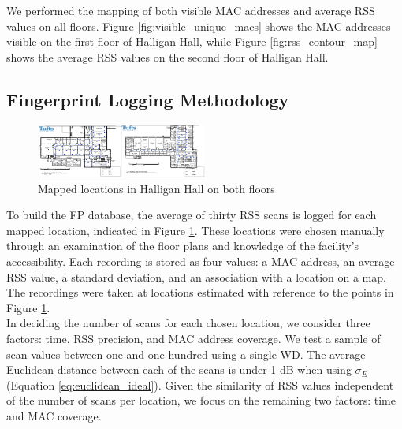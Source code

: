 \documentclass[conference]{IEEEtran}
\begin{document}
We performed the mapping of both visible MAC addresses and average RSS values on all floors. Figure \ref{fig:visible_unique_macs} shows the MAC addresses visible on the first floor of Halligan Hall, while Figure \ref{fig:rss_contour_map} shows the average RSS values on the second floor of Halligan Hall.

\subsection{Fingerprint Logging Methodology}

\begin{figure}[t!] 
  \centering
    \includegraphics[width=0.5\textwidth]{floorImage.png}
     \caption{Mapped locations in Halligan Hall on both floors}
     \label{fig:mapped_positions}
\end{figure}


To build the FP database, the average of thirty RSS scans is logged for each mapped location, indicated in Figure \ref{fig:mapped_positions}. These locations were chosen manually through an examination of the floor plans and knowledge of the facility's accessibility. Each recording is stored as four values: a MAC address, an average RSS value, a standard deviation, and an association with a location on a map. The recordings were taken at locations estimated with reference to the points in Figure \ref{fig:mapped_positions}.\\
\indent In deciding the number of scans for each chosen location, we consider three factors: time, RSS precision, and MAC address coverage. We test a sample of scan values between one and one hundred using a single WD. The average Euclidean distance between each of the scans is under 1 dB when using $\sigma_E$ (Equation \ref{eq:euclidean_ideal}). Given the similarity of RSS values independent of the number of scans per location, we focus on the remaining two factors: time and MAC coverage. 


\begin{table}[!t]
\renewcommand{\arraystretch}{1.3}
\caption{Floor Recording Times (average 1.5 sec/scan)}
\label{tab:table_floor_times}
\centering
{}
\end{table}
\end{document}
